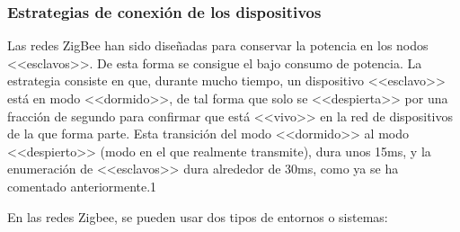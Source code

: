 \subsubsection{Estrategias de conexi\'on de los dispositivos}
Las redes ZigBee han sido dise\~nadas para conservar la potencia en los nodos <<esclavos>>. De esta forma se consigue el
bajo consumo de potencia. La estrategia consiste en que, durante mucho tiempo, un dispositivo
<<esclavo>> est\'a en modo <<dormido>>, de tal forma que solo se
<<despierta>> por una fracci\'on de segundo para confirmar que est\'a
<<vivo>> en la red de dispositivos de la que forma parte. Esta transici\'on del modo
<<dormido>> al modo <<despierto>> (modo en el que realmente
transmite), dura unos 15ms, y la enumeraci\'on de <<esclavos>> dura alrededor de 30ms, como ya
se ha comentado anteriormente.1

En las redes Zigbee, se pueden usar dos tipos de entornos o sistemas:

